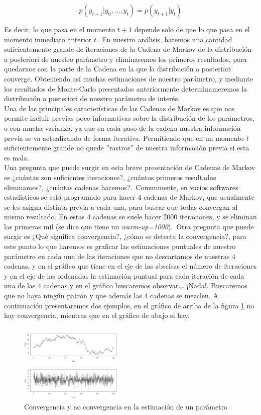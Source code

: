 \documentclass[12pt]{article}
\begin{document}
\[
p(y_{t+1}|y_0,\ldots,y_t)=p(y_{t+1}|y_t)
\]

Es decir, lo que pasa en el momento $t+1$ depende solo de que lo que pasa en el momento inmediato anterior $t$.\
En nuestro análisis, haremos una cantidad suficientemente grande de iteraciones de la Cadena de Markov de la distribución a posteriori de nuestro parámetro y eliminaremos los primeros resultados, para quedarnos con la parte de la Cadena en la que la distribución a posteriori converge. Obteniendo así muchas estimaciones de nuestro parámetro, y mediante los resultados de Monte-Carlo presentados anteriormente determinameremos la distribución a posteriori de nuestro parámetro de interés.\\

Una de las principales características de las Cadenas de Markov es que nos permite incluir previas poco informativas sobre la distribución de los parámetros, o con mucha varianza, ya que en cada paso de la cadena nuestra información previa se va actualizando de forma iterativa. Permitiendo que en un momento \textit{t} suficientemente grande no quede ''rastros'' de nuestra información previa si esta es mala.\\

Una pregunta que puede surgir en esta breve presentación de Cadenas de Markov es ¿cuántas son suficientes iteraciones?, ¿cuántos primeros resultados eliminamos?, ¿cuántas cadenas hacemos?.\
Comunmente, en varios softwares estadísticos se está programado para hacer 4 cadenas de Markov, que usualmente se les asigna distinta previa a cada una, para buscar que todas convergan al mismo resultado. En estas 4 cadenas se suele hacer 2000 iteraciones, y se eliminan las primeras mil (se dice que tiene un \textit{warm-up=1000}).\
Otra pregunta que puede surgir es ¿Qué significa convergencia?, ¿cómo se detecta la convergencia?, para este punto lo que haremos es graficar las estimaciones puntuales de nuestro parámetro en cada una de las iteraciones que no descartamos de nuestras 4 cadenas, y en el gráfico que tiene en el eje de las abscisas el número de iteraciones y en el eje de las ordenadas la estimación puntual para cada iteración de cada una de las 4 cadenas y en el gráfico buscaremos observar... ¡Nada!. Buscaremos que no haya ningún patrón y que además las 4 cadenas se mezclen. A continuación presentaremos dos ejemplos, en el gráfico de arriba de la figura \ref{fig:17} no hay convergencia, mientras que en el gráfico de abajo si hay.\\

\begin{figure}[H]
	\centering
	\includegraphics[width=0.45\textwidth]{grafi/conv_y_no_conv.jpg}
	\caption{Convergencia y no convergencia en la estimación de un parámetro}
	\label{fig:17}
\end{figure}
\end{document}
